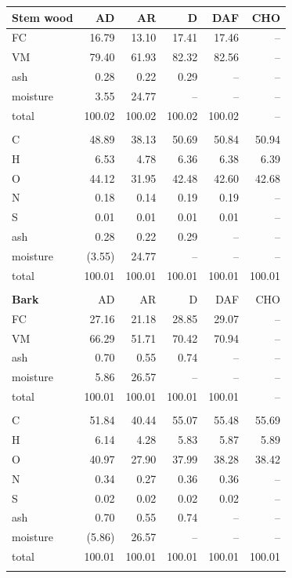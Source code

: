 \begin{center}
\begin{longtable}{lrrrrr}
    \textbf{Stem wood} & AD & AR & D & DAF & CHO \\
    \midrule
    FC       & 16.79  & 13.10  & 17.41  & 17.46  & -- \\
    VM       & 79.40  & 61.93  & 82.32  & 82.56  & -- \\
    ash      & 0.28   & 0.22   & 0.29   & --     & -- \\
    moisture & 3.55   & 24.77  & --     & --     & -- \\
    total    & 100.02 & 100.02 & 100.02 & 100.02 & -- \\
    \\
    C        & 48.89  & 38.13  & 50.69  & 50.84  & 50.94 \\
    H        & 6.53   & 4.78   & 6.36   & 6.38   & 6.39 \\
    O        & 44.12  & 31.95  & 42.48  & 42.60  & 42.68 \\
    N        & 0.18   & 0.14   & 0.19   & 0.19   & -- \\
    S        & 0.01   & 0.01   & 0.01   & 0.01   & -- \\
    ash      & 0.28   & 0.22   & 0.29   & --     & -- \\
    moisture & (3.55) & 24.77  & --     & --     & -- \\
    total    & 100.01 & 100.01 & 100.01 & 100.01 & 100.01 \\
    \\

    \textbf{Bark} & AD & AR & D & DAF & CHO \\
    \midrule
    FC       & 27.16  & 21.18  & 28.85  & 29.07  & -- \\
    VM       & 66.29  & 51.71  & 70.42  & 70.94  & -- \\
    ash      & 0.70   & 0.55   & 0.74   & --     & -- \\
    moisture & 5.86   & 26.57  & --     & --     & -- \\
    total    & 100.01 & 100.01 & 100.01 & 100.01 & -- \\
    \\
    C        & 51.84  & 40.44  & 55.07  & 55.48  & 55.69 \\
    H        & 6.14   & 4.28   & 5.83   & 5.87   & 5.89 \\
    O        & 40.97  & 27.90  & 37.99  & 38.28  & 38.42 \\
    N        & 0.34   & 0.27   & 0.36   & 0.36   & -- \\
    S        & 0.02   & 0.02   & 0.02   & 0.02   & -- \\
    ash      & 0.70   & 0.55   & 0.74   & --     & -- \\
    moisture & (5.86) & 26.57  & --     & --     & -- \\
    total    & 100.01 & 100.01 & 100.01 & 100.01 & 100.01 \\
    \\


\end{longtable}
\end{center}
